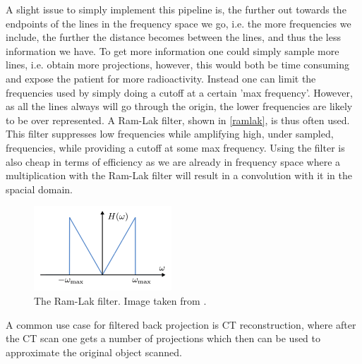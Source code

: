 A slight issue to simply implement this pipeline is, the further out towards the endpoints of the lines in the frequency space we go, i.e. the more frequencies we include, the further the distance becomes between the lines, and thus the less information we have. To get more information one could simply sample more lines, i.e. obtain more projections, however, this would both be time consuming and expose the patient for more radioactivity. Instead one can limit the frequencies used by simply doing a cutoff at a certain 'max frequency'. However, as all the lines always will go through the origin, the lower frequencies are likely to be over represented. A Ram-Lak filter, shown in \autoref{ramlak}, is thus often used. This filter suppresses low frequencies while amplifying high, under sampled, frequencies, while providing a cutoff at some max frequency. Using the filter is also cheap in terms of efficiency as we are already in frequency space where a multiplication with the Ram-Lak filter will result in a convolution with it in the spacial domain.\\
\begin{figure}
	\centering
	\includegraphics[width=0.7\linewidth]{Materials/RamLak}
	\caption{The Ram-Lak filter. Image taken from \cite{MIS}.}
	\label{ramlak}
\end{figure}
A common use case for filtered back projection is CT reconstruction, where after the CT scan one gets a number of projections which then can be used to approximate the original object scanned. 